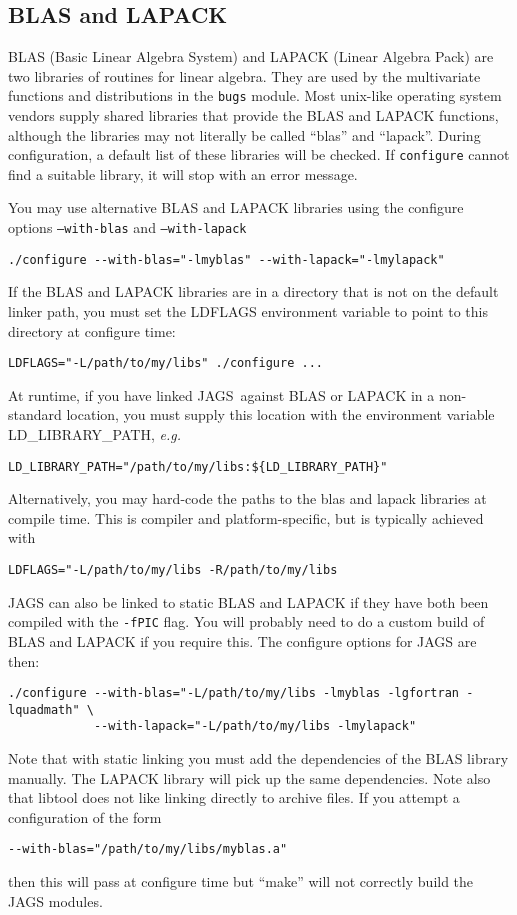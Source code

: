 \documentclass[11pt, a4paper, titlepage]{article}
\newcommand{\JAGS}{\textsf{JAGS}}
\newcommand{\code}[1]{{\bgroup{\normalfont\ttfamily #1}\egroup}}
\begin{document}
\subsection{BLAS and LAPACK}
\label{section:blas:lapack}

BLAS (Basic Linear Algebra System) and LAPACK (Linear Algebra Pack)
are two libraries of routines for linear algebra. They are used by the
multivariate functions and distributions in the \texttt{bugs} module.
Most unix-like operating system vendors supply shared libraries that
provide the BLAS and LAPACK functions, although the libraries may not
literally be called ``blas'' and ``lapack''.  During configuration, a
default list of these libraries will be checked. If \texttt{configure}
cannot find a suitable library, it will stop with an error message.

You may use alternative BLAS and LAPACK libraries using the configure
options \texttt{--with-blas} and \texttt{--with-lapack}
\begin{verbatim}
./configure --with-blas="-lmyblas" --with-lapack="-lmylapack"
\end{verbatim}

If the BLAS and LAPACK libraries are in a directory that is not on the
default linker path, you must set the \code{LDFLAGS} environment variable
to point to this directory at configure time:
\begin{verbatim}
LDFLAGS="-L/path/to/my/libs" ./configure ...
\end{verbatim}

At runtime, if you have linked \JAGS\ against BLAS or LAPACK in
a non-standard location, you must supply this location with the
environment variable \code{LD\_LIBRARY\_PATH}, {\em e.g.}
\begin{verbatim}
LD_LIBRARY_PATH="/path/to/my/libs:${LD_LIBRARY_PATH}"
\end{verbatim}
Alternatively, you may hard-code the paths to the blas and lapack
libraries at compile time. This is compiler and platform-specific,
but is typically achieved with
\begin{verbatim}
LDFLAGS="-L/path/to/my/libs -R/path/to/my/libs
\end{verbatim}

JAGS can also be linked to static BLAS and LAPACK if they have both
been compiled with the \texttt{-fPIC} flag. You will probably need to
do a custom build of BLAS and LAPACK if you require this. The
configure options for JAGS are then:
\begin{verbatim}
./configure --with-blas="-L/path/to/my/libs -lmyblas -lgfortran -lquadmath" \
            --with-lapack="-L/path/to/my/libs -lmylapack"
\end{verbatim}
Note that with static linking you must add the dependencies of the BLAS
library manually. The LAPACK library will pick up the same dependencies.
Note also that libtool does not like linking directly to archive files.
If you attempt a configuration of the form
\begin{verbatim}
--with-blas="/path/to/my/libs/myblas.a"
\end{verbatim}
then this will pass at configure time but ``make'' will not correctly
build the JAGS modules.
\end{document}
